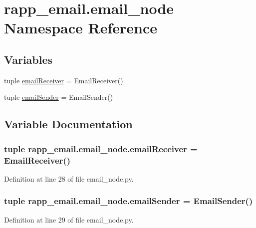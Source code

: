\hypertarget{namespacerapp__email_1_1email__node}{\section{rapp\-\_\-email.\-email\-\_\-node Namespace Reference}
\label{namespacerapp__email_1_1email__node}
}
\subsection*{Variables}
\begin{DoxyCompactItemize}
\item 
tuple \hyperlink{namespacerapp__email_1_1email__node_ae9251dd8ab5a692f1b2ea489d7a94bef}{email\-Receiver} = Email\-Receiver()
\item 
tuple \hyperlink{namespacerapp__email_1_1email__node_aaf8e53caf5cfebf7af01a7d222c326a5}{email\-Sender} = Email\-Sender()
\end{DoxyCompactItemize}


\subsection{Variable Documentation}
\hypertarget{namespacerapp__email_1_1email__node_ae9251dd8ab5a692f1b2ea489d7a94bef}{
\subsubsection[{email\-Receiver}]{\setlength{\rightskip}{0pt plus 5cm}tuple rapp\-\_\-email.\-email\-\_\-node.\-email\-Receiver = Email\-Receiver()}}\label{namespacerapp__email_1_1email__node_ae9251dd8ab5a692f1b2ea489d7a94bef}


Definition at line 28 of file email\-\_\-node.\-py.

\hypertarget{namespacerapp__email_1_1email__node_aaf8e53caf5cfebf7af01a7d222c326a5}{
\subsubsection[{email\-Sender}]{\setlength{\rightskip}{0pt plus 5cm}tuple rapp\-\_\-email.\-email\-\_\-node.\-email\-Sender = Email\-Sender()}}\label{namespacerapp__email_1_1email__node_aaf8e53caf5cfebf7af01a7d222c326a5}


Definition at line 29 of file email\-\_\-node.\-py.

